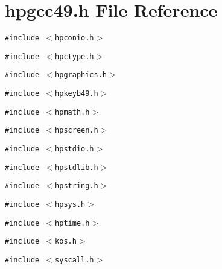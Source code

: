 \section{hpgcc49.h File Reference}
\label{hpgcc49_8h}
{\tt \#include $<$hpconio.h$>$}\par
{\tt \#include $<$hpctype.h$>$}\par
{\tt \#include $<$hpgraphics.h$>$}\par
{\tt \#include $<$hpkeyb49.h$>$}\par
{\tt \#include $<$hpmath.h$>$}\par
{\tt \#include $<$hpscreen.h$>$}\par
{\tt \#include $<$hpstdio.h$>$}\par
{\tt \#include $<$hpstdlib.h$>$}\par
{\tt \#include $<$hpstring.h$>$}\par
{\tt \#include $<$hpsys.h$>$}\par
{\tt \#include $<$hptime.h$>$}\par
{\tt \#include $<$kos.h$>$}\par
{\tt \#include $<$syscall.h$>$}\par
